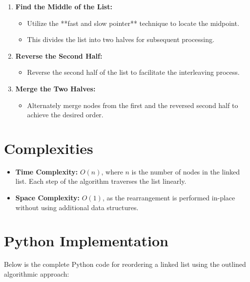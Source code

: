 \begin{enumerate}
    \item \textbf{Find the Middle of the List:}
    \begin{itemize}
        \item Utilize the **fast and slow pointer** technique to locate the midpoint.
        \item This divides the list into two halves for subsequent processing.
    \end{itemize}
    
    \item \textbf{Reverse the Second Half:}
    \begin{itemize}
        \item Reverse the second half of the list to facilitate the interleaving process.
    \end{itemize}
    
    \item \textbf{Merge the Two Halves:}
    \begin{itemize}
        \item Alternately merge nodes from the first and the reversed second half to achieve the desired order.
    \end{itemize}
\end{enumerate}

\section*{Complexities}
\begin{itemize}
    \item \textbf{Time Complexity:} \(O(n)\), where \(n\) is the number of nodes in the linked list. Each step of the algorithm traverses the list linearly.
    \item \textbf{Space Complexity:} \(O(1)\), as the rearrangement is performed in-place without using additional data structures.
\end{itemize}

\section*{Python Implementation}

Below is the complete Python code for reordering a linked list using the outlined algorithmic approach:

